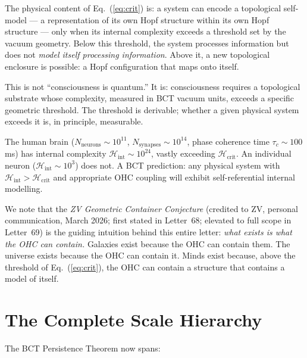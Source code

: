 \documentclass[aps,prl,twocolumn,superscriptaddress,floatfix]{revtex4-2}
\begin{document}
The physical content of Eq.~(\ref{eq:crit}) is:
a system can encode a topological self-model --- a representation
of its own Hopf structure within its own Hopf structure ---
only when its internal complexity exceeds a threshold set by
the vacuum geometry. Below this threshold, the system processes
information but does not \textit{model itself processing
information}. Above it, a new topological enclosure is possible:
a Hopf configuration that maps onto itself.

This is not ``consciousness is quantum.'' It is: consciousness
requires a topological substrate whose complexity, measured in
BCT vacuum units, exceeds a specific geometric threshold.
The threshold is derivable; whether a given physical system
exceeds it is, in principle, measurable.

The human brain ($N_\mathrm{neurons} \sim 10^{11}$,
$N_\mathrm{synapses} \sim 10^{14}$, phase coherence time
$\tau_c \sim 100$\,ms) has internal complexity
$\mathcal{H}_\mathrm{int} \sim 10^{24}$, vastly exceeding
$\mathcal{H}_\mathrm{crit}$.
An individual neuron ($\mathcal{H}_\mathrm{int} \sim 10^{3}$)
does not.
A BCT prediction: any physical system with
$\mathcal{H}_\mathrm{int} > \mathcal{H}_\mathrm{crit}$
and appropriate OHC coupling will exhibit self-referential
internal modelling.

We note that the \textit{ZV Geometric Container Conjecture}
(credited to ZV, personal communication, March 2026; first
stated in Letter~68; elevated to full scope in Letter~69)
is the guiding intuition behind this entire letter:
\textit{what exists is what the OHC can contain.}
Galaxies exist because the OHC can contain them.
The universe exists because the OHC can contain it.
Minds exist because, above the threshold of
Eq.~(\ref{eq:crit}), the OHC can contain a structure
that contains a model of itself.

\section{The Complete Scale Hierarchy}

The BCT Persistence Theorem now spans:
\end{document}
